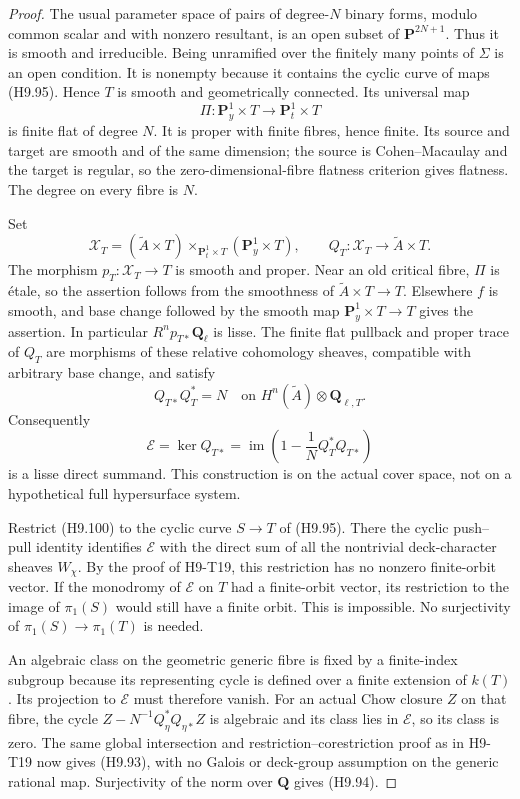 \begin{proof}
The usual parameter space of pairs of degree-$N$ binary forms,
modulo common scalar and with nonzero resultant, is an open
subset of $\mathbf P^{2N+1}$. Thus it is smooth and irreducible.
Being unramified over the finitely many points of $\Sigma$ is
an open condition. It is nonempty because it contains the
cyclic curve of maps (H9.95). Hence $T$ is smooth and
geometrically connected. Its universal map
\[
 \Pi:\mathbf P^1_y\times T\longrightarrow\mathbf P^1_t\times T
\]
is finite flat of degree $N$. It is proper with finite fibres,
hence finite. Its source and target are smooth and of the
same dimension; the source is Cohen--Macaulay and the target
is regular, so the zero-dimensional-fibre flatness criterion
gives flatness. The degree on every fibre is $N$.

Set
\[
 \mathscr X_T=(\widetilde A\times T)
                  \times_{\mathbf P^1_t\times T}
                          (\mathbf P^1_y\times T),
 \qquad Q_T:\mathscr X_T\to\widetilde A\times T.
\]
The morphism $p_T:\mathscr X_T\to T$ is smooth and proper.
Near an old critical fibre, $\Pi$ is \'etale, so the assertion
follows from the smoothness of $\widetilde A\times T\to T$.
Elsewhere $f$ is smooth, and base change followed by the
smooth map $\mathbf P^1_y\times T\to T$ gives the assertion.
In particular $R^n p_{T*}\mathbf Q_\ell$ is lisse. The finite
flat pullback and proper trace of $Q_T$ are morphisms of these
relative cohomology sheaves, compatible with arbitrary base
change, and satisfy
\[
 Q_{T*}Q_T^*=N\quad\text{on }H^n(\widetilde A)\otimes\mathbf Q_{\ell,T}.
\]
Consequently
\[
 \mathscr E=\ker Q_{T*}
    =\operatorname{im}\left(1-\frac1NQ_T^*Q_{T*}\right)
                                                               \tag{H9.100}
\]
is a lisse direct summand. This construction is on the actual
cover space, not on a hypothetical full hypersurface system.

Restrict (H9.100) to the cyclic curve $S\to T$ of (H9.95).
There the cyclic push--pull identity identifies $\mathscr E$
with the direct sum of all the nontrivial deck-character
sheaves $W_\chi$. By the proof of H9-T19, this restriction
has no nonzero finite-orbit vector. If the monodromy of
$\mathscr E$ on $T$ had a finite-orbit vector, its restriction
to the image of $\pi_1(S)$ would still have a finite orbit.
This is impossible. No surjectivity of
$\pi_1(S)\to\pi_1(T)$ is needed.

An algebraic class on the geometric generic fibre is fixed
by a finite-index subgroup because its representing cycle is
defined over a finite extension of $k(T)$. Its projection to
$\mathscr E$ must therefore vanish. For an actual Chow
closure $Z$ on that fibre, the cycle
$Z-N^{-1}Q_\eta^*Q_{\eta*}Z$ is algebraic and its class lies
in $\mathscr E$, so its class is zero. The same global
intersection and restriction--corestriction proof as in
H9-T19 now gives (H9.93), with no Galois or deck-group
assumption on the generic rational map. Surjectivity of the
norm over $\mathbf Q$ gives (H9.94).
\end{proof}

